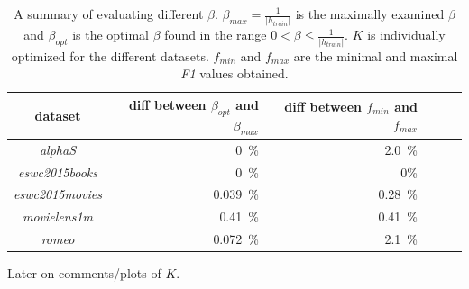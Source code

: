 \begin{table}[h]
    \centering
    \begin{tabular}{| c | r | r | r | r | l |}
        \hline
        \textbf{dataset}        & \textbf{diff between $\beta_{opt}$ and $\beta_{max}$ }    & \textbf{diff between $f_{min}$ and $f_{max}$} \\ \hline

        \textit{alphaS}         & 0~\%      & 2.0~\%    \\ \hline
        \textit{eswc2015books}  & 0~\%      & 0\%       \\ \hline
        \textit{eswc2015movies} & 0.039~\%  & 0.28~\%   \\ \hline
        \textit{movielens1m}    & 0.41~\%   & 0.41~\%   \\ \hline
        \textit{romeo}          & 0.072~\%  & 2.1~\%    \\ \hline


    \end{tabular}
    \caption{A summary of evaluating different $\beta$. $\beta_{max} = \frac{1}{|h_{train}|}$ is the maximally examined $\beta$ and $\beta_{opt}$ is the optimal $\beta$ found in the range $0 < \beta \leq \frac{1}{|h_{train}|}$. $K$ is individually optimized for the different datasets. $f_{min}$ and $f_{max}$ are the minimal and maximal \textit{F1} values obtained.}
    \label{tab:katzeig_beta}
\end{table}

\FloatBarrier

\newpage

Later on comments/plots of $K$.

\FloatBarrier

